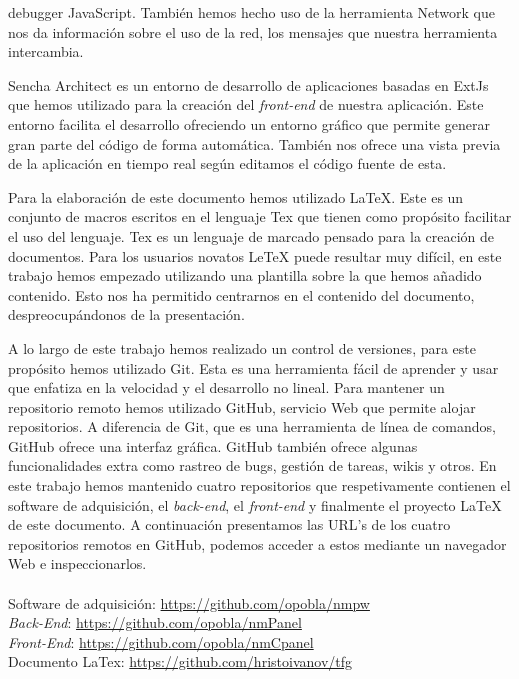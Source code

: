	debugger JavaScript.  También hemos hecho uso de la herramienta Network que nos da información sobre el uso de la red, los mensajes que
	nuestra herramienta intercambia.
	\par
	Sencha Architect es un entorno de desarrollo de aplicaciones basadas en ExtJs que hemos utilizado para la creación del \emph{front-end} de
	nuestra aplicación. Este entorno facilita el desarrollo ofreciendo un entorno gráfico que permite generar gran parte del código de forma
	automática. También nos ofrece una vista previa de la aplicación en tiempo real según editamos el código fuente de esta. 
	\par
	Para la elaboración de este documento hemos utilizado LaTeX\cite{latex}. Este es un conjunto de macros escritos en el lenguaje Tex\cite{tex}
	que tienen como propósito facilitar el uso del lenguaje. Tex es un lenguaje de marcado pensado para la creación de documentos. Para los
	usuarios novatos LeTeX puede resultar muy difícil, en este trabajo hemos empezado utilizando una plantilla sobre la que hemos añadido
	contenido. Esto nos ha permitido centrarnos en el contenido del documento, despreocupándonos de la presentación. 
	\par
	A lo largo de este trabajo hemos realizado un control de versiones, para este propósito hemos utilizado Git\cite{git}. Esta es una herramienta
	fácil de aprender y usar que enfatiza en la velocidad y el desarrollo no lineal. Para mantener un repositorio remoto hemos utilizado
	GitHub\cite{github}, servicio Web que permite alojar repositorios. A diferencia de Git, que es una herramienta de línea de comandos, GitHub
	ofrece una interfaz gráfica. GitHub también ofrece algunas funcionalidades extra como rastreo de bugs, gestión de tareas, wikis y otros. En
	este trabajo hemos mantenido cuatro repositorios que respetivamente contienen el software de adquisición, el \emph{back-end}, el
	\emph{front-end} y finalmente el proyecto LaTeX de este documento. A continuación presentamos las URL’s de los cuatro repositorios remotos en
	GitHub, podemos acceder a estos mediante un navegador Web e inspeccionarlos. 
	\\
	\\	Software de adquisición:	\hfill	\url{https://github.com/opobla/nmpw}
	\\	\emph{Back-End}:		\hfill	\url{https://github.com/opobla/nmPanel}
	\\	\emph{Front-End}:		\hfill	\url{https://github.com/opobla/nmCpanel}
	\\	Documento LaTex:		\hfill	\url{https://github.com/hristoivanov/tfg}

